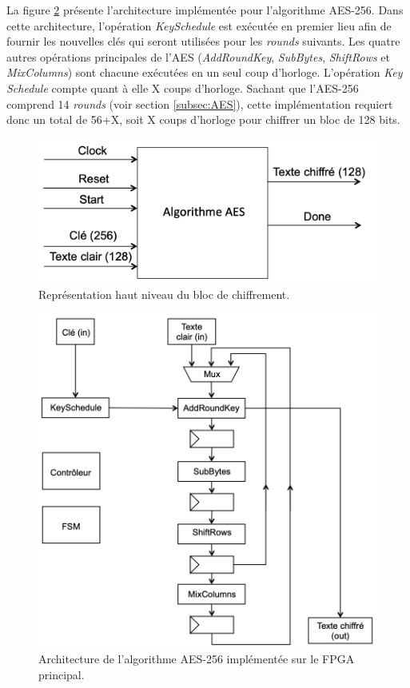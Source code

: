 \documentclass[oneside]{book}
\begin{document}
La figure \ref{fig:FPGA_arch} présente l'architecture implémentée pour l'algorithme AES-256. Dans cette architecture, l'opération \textit{KeySchedule} est exécutée en premier lieu afin de fournir les nouvelles clés qui seront utilisées pour les \textit{rounds} suivants. Les quatre autres opérations principales de l'AES (\textit{AddRoundKey}, \textit{SubBytes}, \textit{ShiftRows} et \textit{MixColumns}) sont chacune exécutées en un seul coup d'horloge. L'opération \textit{Key Schedule} compte quant à elle X coups d'horloge. Sachant que l'AES-256 comprend 14 \textit{rounds} (voir section \ref{subsec:AES}), cette implémentation requiert donc un total de 56+X, soit X coups d'horloge pour chiffrer un bloc de 128 bits.

\begin{figure}[htbp]
    \centering
    \includegraphics[scale=0.45]{image/FPGA_AES_TOP}
    \caption{Représentation haut niveau du bloc de chiffrement.}
    \label{fig:FPGA_AES_TOP} 
\end{figure}

\begin{figure}[htbp]
    \centering
    \includegraphics[scale=0.9]{image/FPGA_arch}
    \caption{Architecture de l'algorithme AES-256 implémentée sur le FPGA principal.}
    \label{fig:FPGA_arch} 
\end{figure}
\end{document}
